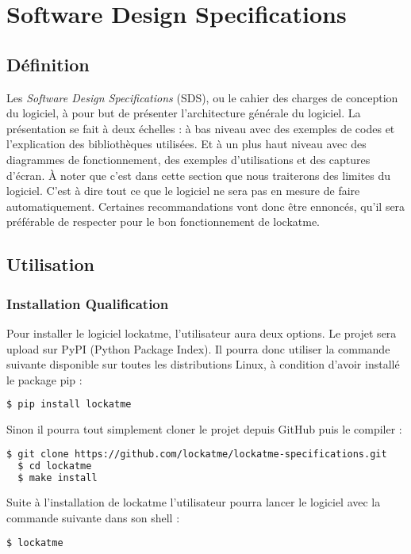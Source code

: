 \chapter{Software Design Specifications}
\newpage

\section{Définition}
Les \emph{Software Design Specifications} (SDS), ou le cahier des charges de conception
du logiciel, à pour but de présenter l'architecture générale du logiciel.
La présentation se fait à deux échelles : à bas niveau avec des exemples de codes et
l'explication des bibliothèques utilisées. Et à un plus haut niveau avec des diagrammes
de fonctionnement, des exemples d'utilisations et des captures d'écran. À noter
que c'est dans cette section que nous traiterons des limites du logiciel. C'est
à dire tout ce que le logiciel ne sera pas en mesure de faire automatiquement.
Certaines recommandations vont donc être ennoncés, qu'il sera préférable de
respecter pour le bon fonctionnement de lockatme.
\section{Utilisation}
  \subsection{Installation Qualification}
Pour installer le logiciel lockatme, l'utilisateur aura deux options. Le
projet sera upload sur PyPI (Python Package Index). Il pourra donc utiliser la commande
suivante disponible sur toutes les distributions Linux, à condition d'avoir
installé le package pip :
\begin{lstlisting}[language=bash]
  $ pip install lockatme
\end{lstlisting}
Sinon il pourra tout simplement cloner le projet depuis GitHub puis le compiler :
\begin{lstlisting}[language=bash]
  $ git clone https://github.com/lockatme/lockatme-specifications.git
  $ cd lockatme
  $ make install
\end{lstlisting}
Suite à l'installation de lockatme l'utilisateur pourra lancer le logiciel
avec la commande suivante dans son shell :
\begin{lstlisting}[language=bash]
  $ lockatme
\end{lstlisting}

